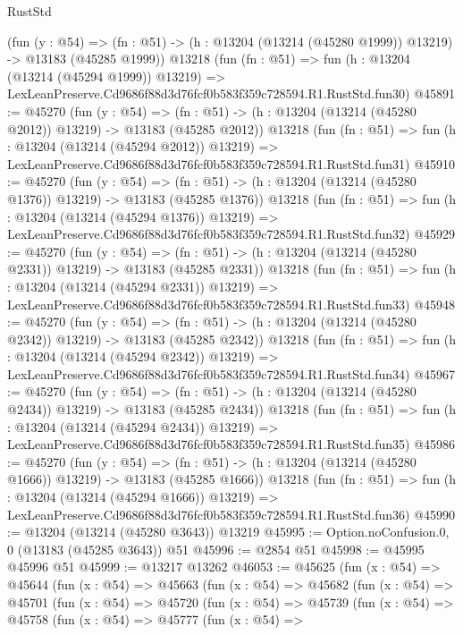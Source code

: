 \begin{lexlean}{RustStd}
\begin{coremodule}
    (fun (y : @54) =>
    (fn : @51) -> (h : @13204 (@13214 (@45280 @1999)) @13219) -> @13183 (@45285 @1999))
    @13218
    (fun (fn : @51) =>
    fun (h : @13204 (@13214 (@45294 @1999)) @13219) =>
    LexLeanPreserve.Cd9686f88d3d76fcf0b583f359c728594.R1.RustStd.fun30)
@45891 := @45270
    (fun (y : @54) =>
    (fn : @51) -> (h : @13204 (@13214 (@45280 @2012)) @13219) -> @13183 (@45285 @2012))
    @13218
    (fun (fn : @51) =>
    fun (h : @13204 (@13214 (@45294 @2012)) @13219) =>
    LexLeanPreserve.Cd9686f88d3d76fcf0b583f359c728594.R1.RustStd.fun31)
@45910 := @45270
    (fun (y : @54) =>
    (fn : @51) -> (h : @13204 (@13214 (@45280 @1376)) @13219) -> @13183 (@45285 @1376))
    @13218
    (fun (fn : @51) =>
    fun (h : @13204 (@13214 (@45294 @1376)) @13219) =>
    LexLeanPreserve.Cd9686f88d3d76fcf0b583f359c728594.R1.RustStd.fun32)
@45929 := @45270
    (fun (y : @54) =>
    (fn : @51) -> (h : @13204 (@13214 (@45280 @2331)) @13219) -> @13183 (@45285 @2331))
    @13218
    (fun (fn : @51) =>
    fun (h : @13204 (@13214 (@45294 @2331)) @13219) =>
    LexLeanPreserve.Cd9686f88d3d76fcf0b583f359c728594.R1.RustStd.fun33)
@45948 := @45270
    (fun (y : @54) =>
    (fn : @51) -> (h : @13204 (@13214 (@45280 @2342)) @13219) -> @13183 (@45285 @2342))
    @13218
    (fun (fn : @51) =>
    fun (h : @13204 (@13214 (@45294 @2342)) @13219) =>
    LexLeanPreserve.Cd9686f88d3d76fcf0b583f359c728594.R1.RustStd.fun34)
@45967 := @45270
    (fun (y : @54) =>
    (fn : @51) -> (h : @13204 (@13214 (@45280 @2434)) @13219) -> @13183 (@45285 @2434))
    @13218
    (fun (fn : @51) =>
    fun (h : @13204 (@13214 (@45294 @2434)) @13219) =>
    LexLeanPreserve.Cd9686f88d3d76fcf0b583f359c728594.R1.RustStd.fun35)
@45986 := @45270
    (fun (y : @54) =>
    (fn : @51) -> (h : @13204 (@13214 (@45280 @1666)) @13219) -> @13183 (@45285 @1666))
    @13218
    (fun (fn : @51) =>
    fun (h : @13204 (@13214 (@45294 @1666)) @13219) =>
    LexLeanPreserve.Cd9686f88d3d76fcf0b583f359c728594.R1.RustStd.fun36)
@45990 := @13204 (@13214 (@45280 @3643)) @13219
@45995 := Option.noConfusion.{0, 0} (@13183 (@45285 @3643)) @51
@45996 := @2854 @51
@45998 := @45995 @45996 @51
@45999 := @13217 @13262
@46053 := @45625
    (fun (x : @54) =>
    @45644
      (fun (x : @54) =>
      @45663
        (fun (x : @54) =>
        @45682
          (fun (x : @54) =>
          @45701
            (fun (x : @54) =>
            @45720
              (fun (x : @54) =>
              @45739
                (fun (x : @54) =>
                @45758
                  (fun (x : @54) =>
                  @45777
                    (fun (x : @54) =>

\end{coremodule}
\end{lexlean}
